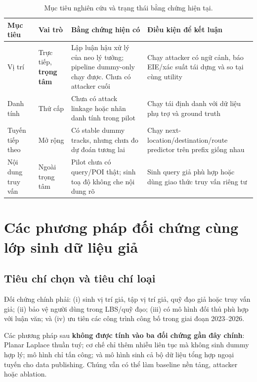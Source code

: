 \documentclass[12pt,a4paper,oneside]{report}
\newcommand{\core}{\textcolor{reportred}{\textbf{trọng tâm}}}
\begin{document}
\begin{table}[htbp]
\centering
\small
\caption{Mục tiêu nghiên cứu và trạng thái bằng chứng hiện tại.}
\label{tab:targets}
\begin{tabularx}{\textwidth}{P{2.5cm}P{3.0cm}Y Y}
\toprule
\textbf{Mục tiêu} & \textbf{Vai trò} & \textbf{Bằng chứng hiện có} & \textbf{Điều kiện để kết luận} \\
\midrule
Vị trí & Trực tiếp, \core{} & Lập luận hậu xử lý của neo lý tưởng; pipeline dummy-only chạy được. Chưa có attacker cuối & Chạy attacker có ngữ cảnh, báo EIE/xác suất tái dựng và so tại cùng utility \\
Danh tính & Thứ cấp & Chưa có attack linkage hoặc nhãn danh tính trong pilot & Chạy tái định danh với dữ liệu phụ trợ và ground truth \\
Tuyến tiếp theo & Mở rộng & Có stable dummy tracks, nhưng chưa đo dự đoán tương lai & Chạy next-location/destination/route predictor trên prefix giống nhau \\
Nội dung truy vấn & Ngoài trọng tâm & Pilot chưa có query/POI thật; sinh toạ độ không che nội dung rõ & Sinh query giả phù hợp hoặc dùng giao thức truy vấn riêng tư \\
\bottomrule
\end{tabularx}
\end{table}

\chapter{Các phương pháp đối chứng cùng lớp sinh dữ liệu giả}

\section{Tiêu chí chọn và tiêu chí loại}

Đối chứng chính phải: (i) sinh vị trí giả, tập vị trí giả, quỹ đạo giả hoặc truy vấn giả; (ii) bảo vệ người dùng trong LBS/quỹ đạo; (iii) có mô hình đối thủ phù hợp với luận văn; và (iv) ưu tiên các công trình công bố trong giai đoạn 2023--2026.

Các phương pháp sau \textbf{không được tính vào ba đối chứng gần đây chính}: Planar Laplace thuần tuý; cơ chế chỉ thêm nhiễu liên tục mà không sinh dummy hợp lý; mô hình chỉ tấn công; và mô hình sinh cả bộ dữ liệu tổng hợp ngoại tuyến cho data publishing. Chúng vẫn có thể làm baseline nền tảng, attacker hoặc ablation.
\end{document}
